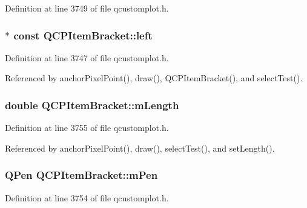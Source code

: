 Definition at line 3749 of file qcustomplot.\+h.

\hypertarget{class_q_c_p_item_bracket_af6cc6d27d96171778c6927d6edce48b0}{}
\subsubsection[{left}]{$\ast$ const Q\+C\+P\+Item\+Bracket\+::left}\label{class_q_c_p_item_bracket_af6cc6d27d96171778c6927d6edce48b0}


Definition at line 3747 of file qcustomplot.\+h.



Referenced by anchor\+Pixel\+Point(), draw(), Q\+C\+P\+Item\+Bracket(), and select\+Test().

\hypertarget{class_q_c_p_item_bracket_ab3d99bba8da18eb4d0e0cb23dded33b2}{}
\subsubsection[{m\+Length}]{\setlength{\rightskip}{0pt plus 5cm}double Q\+C\+P\+Item\+Bracket\+::m\+Length\hspace{0.3cm}{\ttfamily [protected]}}\label{class_q_c_p_item_bracket_ab3d99bba8da18eb4d0e0cb23dded33b2}


Definition at line 3755 of file qcustomplot.\+h.



Referenced by anchor\+Pixel\+Point(), draw(), select\+Test(), and set\+Length().

\hypertarget{class_q_c_p_item_bracket_a350c864a5853b04343719f5a8be6b675}{}
\subsubsection[{m\+Pen}]{\setlength{\rightskip}{0pt plus 5cm}Q\+Pen Q\+C\+P\+Item\+Bracket\+::m\+Pen\hspace{0.3cm}{\ttfamily [protected]}}\label{class_q_c_p_item_bracket_a350c864a5853b04343719f5a8be6b675}


Definition at line 3754 of file qcustomplot.\+h.



